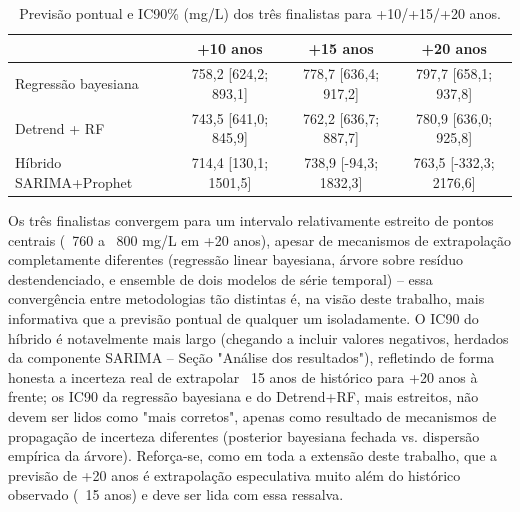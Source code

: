 \begin{table}[H]
    \centering
    \small
    \begin{tabular}{l|c|c|c}
         & +10 anos & +15 anos & +20 anos \\ \hline
        Regressão bayesiana & 758,2 [624,2; 893,1] & 778,7 [636,4; 917,2] & 797,7 [658,1; 937,8] \\
        Detrend + RF & 743,5 [641,0; 845,9] & 762,2 [636,7; 887,7] & 780,9 [636,0; 925,8] \\
        Híbrido SARIMA+Prophet & 714,4 [130,1; 1501,5] & 738,9 [-94,3; 1832,3] & 763,5 [-332,3; 2176,6] \\
    \end{tabular}
    \caption{Previsão pontual e IC90\% (mg/L) dos três finalistas para +10/+15/+20 anos.}
    \label{tab:sintese-finalistas}
\end{table}

Os três finalistas convergem para um intervalo relativamente estreito de pontos centrais (~760 a ~800 mg/L em +20 anos), apesar de mecanismos de extrapolação completamente diferentes (regressão linear bayesiana, árvore sobre resíduo destendenciado, e ensemble de dois modelos de série temporal) -- essa convergência entre metodologias tão distintas é, na visão deste trabalho, mais informativa que a previsão pontual de qualquer um isoladamente. O IC90 do híbrido é notavelmente mais largo (chegando a incluir valores negativos, herdados da componente SARIMA -- Seção "Análise dos resultados"), refletindo de forma honesta a incerteza real de extrapolar ~15 anos de histórico para +20 anos à frente; os IC90 da regressão bayesiana e do Detrend+RF, mais estreitos, não devem ser lidos como "mais corretos", apenas como resultado de mecanismos de propagação de incerteza diferentes (posterior bayesiana fechada vs. dispersão empírica da árvore). Reforça-se, como em toda a extensão deste trabalho, que a previsão de +20 anos é extrapolação especulativa muito além do histórico observado (~15 anos) e deve ser lida com essa ressalva.
